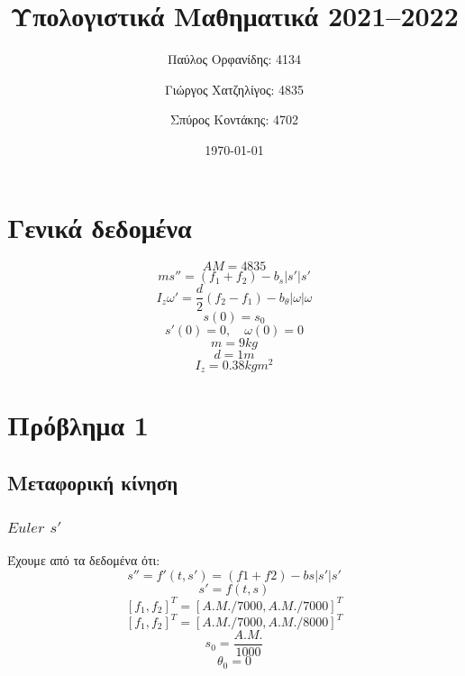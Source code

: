 \documentclass[a4paper]{article}
\author{Παύλος Ορφανίδης: 4134 \and Γιώργος Χατζηλίγος: 4835 \and Σπύρος Κοντάκης: 4702}
\date{\today}
\title{Υπολογιστικά Μαθηματικά 2021--2022}
\begin{document}
    \maketitle
    \tableofcontents


    \section*{Γενικά δεδομένα}
        \begin{equation}
            AM = 4835
        \end{equation}
        \begin{equation}
            ms'' = (f_1+f_2)-b_s\rvert s' \lvert s'
        \end{equation}
        \begin{equation}
            I_z\omega '=\frac{d}{2}(f_2-f_1)-b_{\theta}\rvert\omega\lvert\omega
        \end{equation}
        \begin{equation}
            s(0)=s_0
        \end{equation}
        \begin{equation}
            s'(0)=0,\quad \omega(0)=0
        \end{equation}
        \[m=9kg\]
        \[d=1m\]
        \[I_z=0.38 kgm^2\]
    \section{Πρόβλημα 1}
        \subsection*{Μεταφορική κίνηση}
        \subsubsection*{$Euler$ $s'$}
        Έχουμε από τα δεδομένα ότι:
        \begin{equation}
            s''=f'(t,s')=(f1+f2)-bs|s'|s'
        \end{equation}
        \begin{equation}
            s'=f(t,s)
        \end{equation}
        \[{[f_1,f_2]}^T={[A.M./7000, A.M./7000]}^T\]
        \[{[f_1,f_2]}^T={[A.M./7000, A.M./8000]}^T\]
        \[s_0=\frac{A.M.}{1000}\]
        \[\theta_0=0\]
\end{document}
